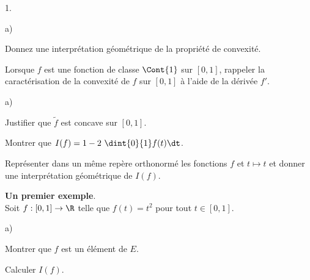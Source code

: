 \begin{noliste}{1.}
 \setlength{\itemsep}{4mm}
 \item 
 \begin{noliste}{a)}
  \setlength{\itemsep}{2mm}
  \item Donnez une interprétation géométrique de la propriété de 
  convexité.
  
  
  
  
  

  
  \item Lorsque $f$ est une fonction de classe $\Cont{1}$ sur $[0,1]$, 
  rappeler la caractérisation de la convexité de $f$ sur $[0,1]$ à 
  l'aide de la dérivée $f'$.
  
  

 \end{noliste}
 
 \item 
 \begin{noliste}{a)}
  \setlength{\itemsep}{2mm}
  \item Justifier que $\tilde{f}$ est concave sur $[0,1]$.
  
  
  
  \item Montrer que $I(f)= 1-2 \ \dint{0}{1}f(t) \dt$. 
  
  

  
  \item Représenter dans un même repère orthonormé les fonctions $f$ et 
  $t \mapsto t $ et donner une interprétation géométrique de $I(f)$.
  
  
 \end{noliste}
 
 
 
 
 
 
 \item \textbf{Un premier exemple}.\\
 Soit $f : [0,1] \to \R$ telle que $f(t)= t^2$ pour tout $t \in [0,1]$. 
 \begin{noliste}{a)}
  \setlength{\itemsep}{2mm}
  \item Montrer que $f$ est un élément de $E$.
  
  

  
  \item Calculer $I(f)$. 
  
  
 \end{noliste}
 

\newpage



\end{noliste}
